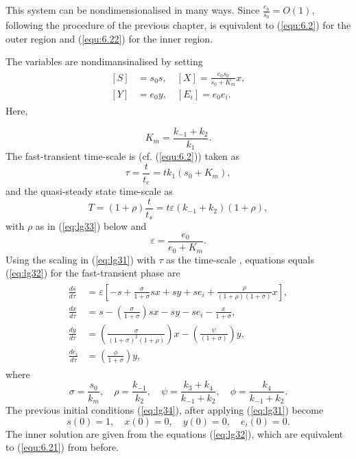 \documentclass[a4paper]{report}
\theoremstyle{definition}
\begin{document}
This system can be nondimensionalised in many ways. Since $\frac{e_0}{s_0}=O(1)$, following the procedure of the previous chapter, is equivalent to (\ref{equ:6.2}) for the outer region and (\ref{equ:6.22}) for the inner region.

The variables are nondimansinalised by setting
\begin{align}
\begin{split}
[S]&=s_0s, \quad [X]=\frac{e_0s_0}{s_0+K_m}x, \\
[Y]&=e_0y, \quad [E_i]=e_0e_i.
\end{split}
\label{eq:lg31}
\end{align}
Here,

\begin{equation}
K_m=\frac{k_{-1}+k_2}{k_1}.
\end{equation}
The fast-transient time-scale is (cf. (\ref{equ:6.2})) taken as 
\begin{equation}
\tau=\frac{t}{t_c}=tk_1(s_0+K_m),
\end{equation}
and the quasi-steady state time-scale as
\begin{equation}
T=(1+\rho)\frac{t}{t_s}=t\varepsilon(k_{-1}+k_2)(1+\rho),
\label{eq:lg46}
\end{equation}
with $\rho$ as in (\ref{eq:lg33}) below and
\begin{equation}
\varepsilon=\frac{e_0}{e_0+K_m}.
\label{eq:lg36}
\end{equation}
Using the scaling in (\ref{eq:lg31}) with $\tau$ as the time-scale , equations equals (\ref{eq:lg32}) for the fast-transient phase are
\begin{align}
\begin{split}
\frac{ds}{d\tau}&=\varepsilon \left[-s+\frac{\sigma}{1+\sigma}sx+sy+se_i+\frac{\rho}{(1+\rho)(1+\sigma)}x\right], \\
\frac{dx}{d\tau}&=s-\left(\frac{\sigma}{1+\sigma}\right)sx-sy-se_i-\frac{x}{1+\sigma}, \\
\frac{dy}{d\tau}&=\left(\frac{\sigma}{(1+\sigma)^2(1+\rho)}\right)x-\left(\frac{\psi}{(1+\sigma)}\right)y,\\
\frac{de_i}{d\tau}&=\left(\frac{\phi}{1+\sigma}\right)y,
\end{split}
\label{eq:lg32}
\end{align}
where
\begin{equation}
\sigma=\frac{s_0}{k_m}, \quad \rho=\frac{k_{-1}}{k_2}, \quad \psi=\frac{k_3+k_4}{k_{-1}+k_2}, \quad \phi=\frac{k_4}{k_{-1}+k_2}.
\label{eq:lg33}
\end{equation}
The previous initial conditions (\ref{eq:lg34}), after applying (\ref{eq:lg31}) become
\begin{equation}
s(0)=1, \quad x(0)=0, \quad y(0)=0, \quad e_i(0)=0. 
\label{eq:lg37}
\end{equation}
The inner solution are given from the equations (\ref{eq:lg32}), which are equivalent to (\ref{equ:6.21}) from before.
\end{document}

